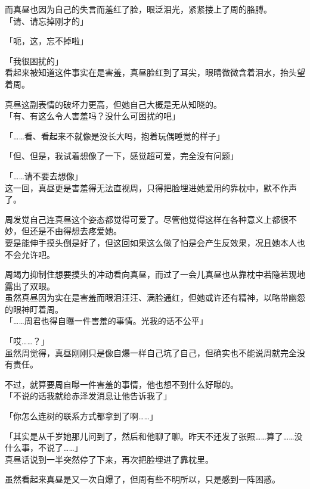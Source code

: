 而真昼也因为自己的失言而羞红了脸，眼泛泪光，紧紧搂上了周的胳膊。\\

「请、请忘掉刚才的」

「呃，这，忘不掉啦」

「我很困扰的」\\

看起来被知道这件事实在是害羞，真昼脸红到了耳尖，眼睛微微含着泪水，抬头望着周。

真昼这副表情的破坏力更高，但她自己大概是无从知晓的。\\

「有、有这么令人害羞吗？没什么可困扰的吧」

「……看、看起来不就像是没长大吗，抱着玩偶睡觉的样子」

「但、但是，我试着想像了一下，感觉超可爱，完全没有问题」

「……请不要去想像」\\

这一回，真昼更是害羞得无法直视周，只得把脸埋进她爱用的靠枕中，默不作声了。

周发觉自己连真昼这个姿态都觉得可爱了。尽管他觉得这样在各种意义上都很不妙，但还是不由得想去疼爱她。\\

要是能伸手摸头倒是好了，但这回如果这么做了怕是会产生反效果，况且她本人也不会允许吧。

周竭力抑制住想要摸头的冲动看向真昼，而过了一会儿真昼也从靠枕中若隐若现地露出了双眼。\\

虽然真昼因为实在是害羞而眼泪汪汪、满脸通红，但她或许还有精神，以略带幽怨的眼神盯着周。\\

「……周君也得自曝一件害羞的事情。光我的话不公平」

「哎……？」\\

虽然周觉得，真昼刚刚只是像自爆一样自己坑了自己，但确实也不能说周就完全没有责任。

不过，就算要周自曝一件害羞的事情，他也想不到什么好曝的。\\

「不说的话我就给赤泽发消息让他告诉我了」

「你怎么连树的联系方式都拿到了啊……」

「其实是从千岁她那儿问到了，然后和他聊了聊。昨天不还发了张照……算了……没什么事，不说了……」\\

真昼话说到一半突然停了下来，再次把脸埋进了靠枕里。

虽然看起来真昼是又一次自爆了，但周有些不明所以，只是感到一阵困惑。
